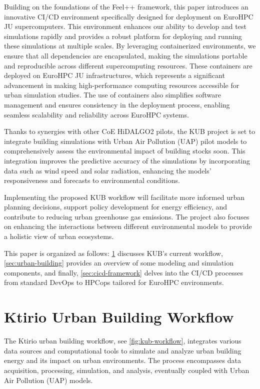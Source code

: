 \documentclass[runningheads]{llncs}
\begin{document}
Building on the foundations of the Feel++ framework, this paper introduces an innovative CI/CD environment specifically designed for deployment on EuroHPC JU supercomputers. 
This environment enhances our ability to develop and test simulations rapidly and provides a robust platform for deploying and running these simulations at multiple scales. 
By leveraging containerized environments, we ensure that all dependencies are encapsulated, making the simulations portable and reproducible across different supercomputing resources. 
These containers are deployed on EuroHPC JU infrastructures, which represents a significant advancement in making high-performance computing resources accessible for urban simulation studies. 
The use of containers also simplifies software management and ensures consistency in the deployment process, enabling seamless scalability and reliability across EuroHPC systems.

Thanks to synergies with other CoE HiDALGO2 pilots, the KUB project is set to integrate building simulations with Urban Air Pollution (UAP) pilot models to comprehensively assess the environmental impact of building stocks soon. This integration improves the predictive accuracy of the simulations by incorporating data such as wind speed and solar radiation, enhancing the models' responsiveness and forecasts to environmental conditions.

Implementing the proposed KUB workflow will facilitate more informed urban planning decisions, support policy development for energy efficiency, and contribute to reducing urban greenhouse gas emissions. The project also focuses on enhancing the interactions between different environmental models to provide a holistic view of urban ecosystems.

This paper is organized as follows: \cref{sec:kub-workflow} discusses KUB's current workflow, \cref{sec:urban-building} provides an overview of some modeling and simulation components, and finally, \cref{sec:cicd-framework} delves into the CI/CD processes from standard DevOps to HPCops tailored for EuroHPC environments.


\section{Ktirio Urban Building Workflow}
\label{sec:kub-workflow}

The Ktirio urban building workflow, see \cref{fig:kub-workflow}, integrates various data sources and computational tools to simulate and analyze urban building energy and its impact on urban environments. The process encompasses data acquisition, processing, simulation, and analysis, eventually coupled with Urban Air Pollution (UAP) models.
\end{document}
